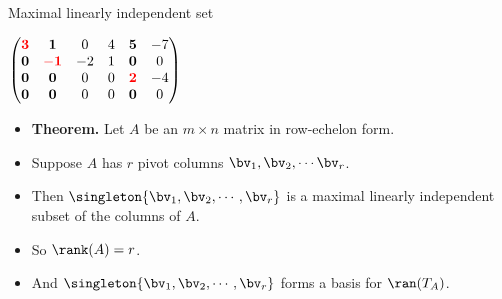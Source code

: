 \documentclass{beamer}
\begin{document}
\begin{frame}{Maximal linearly independent set}

$
\begin{pmatrix}
\textcolor{red}{\mathbf{3}} & \mathbf{1}                   &  0  & 4 & \mathbf{5}                  & -7 \\
\mathbf{0}                  & \textcolor{red}{\mathbf{-1}} & -2  & 1 & \mathbf{0}                  & 0  \\
\mathbf{0}                  & \mathbf{0}                   &  0  & 0 & \textcolor{red}{\mathbf{2}} & -4 \\
\mathbf{0}                  & \mathbf{0}                   &  0  & 0 & \mathbf{0}                  & 0  \\
\end{pmatrix}
$
\begin{itemize}
\item \textbf{Theorem.} Let $A$ be an $m\times n$ matrix in row-echelon form.
\item Suppose $A$ has $r$ pivot columns $\bv_1,\bv_2,\cdots\bv_r$.
\item Then $\singleton{\bv_1,\bv_2,\cdots,\bv_r}$ is a maximal linearly independent subset of the columns of $A$.
\item So $\rank(A)=r$.
\item And $\singleton{\bv_1,\bv_2,\cdots,\bv_r}$ forms a basis for $\ran(T_A)$.
\end{itemize}

\end{frame}

\end{document}
